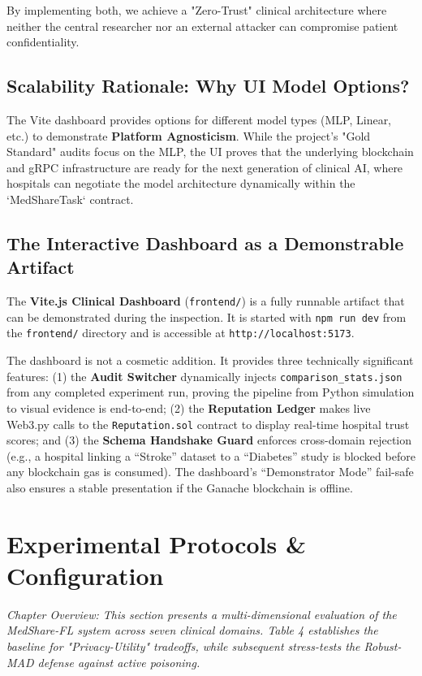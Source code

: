 \documentclass[10pt, a4paper, twocolumn]{article}
\begin{document}
By implementing both, we achieve a "Zero-Trust" clinical architecture where neither the central researcher nor an external attacker can compromise patient confidentiality.

\subsection{Scalability Rationale: Why UI Model Options?}
The Vite dashboard provides options for different model types (MLP, Linear, etc.) to demonstrate \textbf{Platform Agnosticism}. While the project's "Gold Standard" audits focus on the MLP, the UI proves that the underlying blockchain and gRPC infrastructure are ready for the next generation of clinical AI, where hospitals can negotiate the model architecture dynamically within the `MedShareTask` contract.

\subsection{The Interactive Dashboard as a Demonstrable Artifact}
The \textbf{Vite.js Clinical Dashboard} (\texttt{frontend/}) is a fully runnable artifact that can be demonstrated during the inspection. It is started with \texttt{npm run dev} from the \texttt{frontend/} directory and is accessible at \texttt{http://localhost:5173}.

The dashboard is not a cosmetic addition. It provides three technically significant features: (1) the \textbf{Audit Switcher} dynamically injects \texttt{comparison\_stats.json} from any completed experiment run, proving the pipeline from Python simulation to visual evidence is end-to-end; (2) the \textbf{Reputation Ledger} makes live Web3.py calls to the \texttt{Reputation.sol} contract to display real-time hospital trust scores; and (3) the \textbf{Schema Handshake Guard} enforces cross-domain rejection (e.g., a hospital linking a ``Stroke'' dataset to a ``Diabetes'' study is blocked before any blockchain gas is consumed). The dashboard's ``Demonstrator Mode'' fail-safe also ensures a stable presentation if the Ganache blockchain is offline.

\section{Experimental Protocols \& Configuration}

\textit{Chapter Overview: This section presents a multi-dimensional evaluation of the MedShare-FL system across seven clinical domains. Table 4 establishes the baseline for "Privacy-Utility" tradeoffs, while subsequent stress-tests the Robust-MAD defense against active poisoning.}
\end{document}
